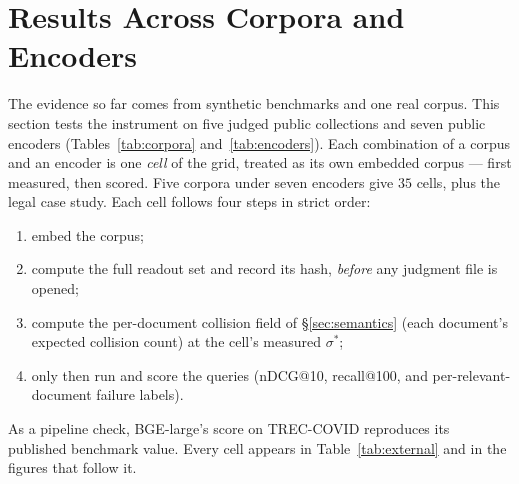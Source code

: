 \documentclass[11pt,letterpaper]{article}
\newcommand{\sstar}{\sigma^{*}}
\begin{document}
\section{Results Across Corpora and Encoders}
\label{sec:external}

The evidence so far comes from synthetic benchmarks and one real corpus.
This section tests the instrument on five judged public collections and
seven public encoders (Tables~\ref{tab:corpora} and~\ref{tab:encoders}).
Each combination of a corpus and an encoder is one \emph{cell} of the
grid, treated as its own embedded corpus --- first measured, then scored.
Five corpora under seven encoders give $35$ cells, plus the legal case
study. Each cell follows four steps in strict order:
\begin{enumerate}
\item embed the corpus;
\item compute the full readout set and record its hash, \emph{before} any
  judgment file is opened;
\item compute the per-document collision field of \S\ref{sec:semantics}
  (each document's expected collision count) at the cell's measured
  $\sstar$;
\item only then run and score the queries (nDCG@10, recall@100, and
  per-relevant-document failure labels).
\end{enumerate}
As a pipeline check, BGE-large's score on TREC-COVID reproduces its
published benchmark value. Every cell appears in
Table~\ref{tab:external} and in the figures that follow it.
\end{document}
